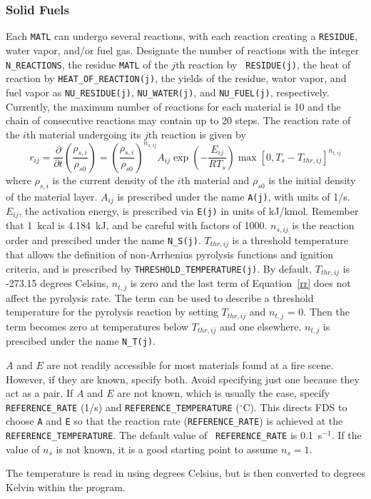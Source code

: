 \documentclass[11pt]{book}
\newcommand{\ct}{\tt\small}
\newcommand{\dod}[2]{\frac{\partial #1}{\partial #2}}
\newcommand{\be}{\begin{equation}}
\newcommand{\ee}{\end{equation}}
\begin{document}
\subsubsection{Solid Fuels}

Each {\ct MATL} can undergo several reactions, with each
reaction creating a {\ct RESIDUE}, water vapor, and/or fuel
gas. Designate the number of reactions with the integer {\ct
N\_REACTIONS}, the residue {\ct MATL} of the $j$th reaction by {\ct
RESIDUE(j)}, the heat of reaction by {\ct HEAT\_OF\_REACTION(j)}, the
yields of the residue, wator vapor, and fuel vapor as
{\ct NU\_RESIDUE(j)}, {\ct NU\_WATER(j)}, and {\ct NU\_FUEL(j)},
respectively. Currently, the maximum number of reactions for each
material is 10 and the chain of consecutive reactions may contain up
to 20 steps. The reaction rate of the $i$th material undergoing its
$j$th reaction is given by
\be
  r_{ij} =
  \dod{ }{t} \left( \frac{\rho_{s,i}}{\rho_{s0}} \right) =
  \left(\frac{\rho_{s,i}}{\rho_{s0}} \right)^{n_{s,ij}}
  A_{ij} \exp\left(-\frac{E_{ij}}{RT_s} \right)
  \max\left[0,T_s-T_{thr,ij}\right]^{n_{t,ij}}  \label{rr}
\ee
where $\rho_{s,i}$ is the current density of the $i$th material and
$\rho_{s0}$ is the initial density of the material layer.
$A_{ij}$ is prescribed under the name {\ct A(j)}, with units of
1/s. $E_{ij}$, the activation energy, is prescribed via {\ct E(j)} in
units of kJ/kmol. Remember that 1~kcal is 4.184~kJ, and be careful
with factors of 1000. $n_{s,ij}$ is the reaction order and prescibed under the name
{\ct N\_S(j)}. $T_{thr,ij}$ is a threshold temperature that
allows the definition of non-Arrhenius pyrolysis functions and
ignition criteria, and is prescribed by {\ct THRESHOLD\_TEMPERATURE(j)}.
By default, $T_{thr,ij}$ is -273.15 degrees Celsius, $n_{t,j}$ is zero
and the last term of Equation~\ref{rr} does not affect the pyrolysis rate.
The term can be used to describe a threshold temperature for the pyrolysis
reaction by setting $T_{thr,ij}$ and $n_{t,j}$ = 0. Then the term
becomes zero at temperatures below $T_{thr,ij}$ and one elsewhere.
$n_{t,j}$ is prescibed under the name {\ct N\_T(j)}.

$A$ and $E$  are not readily accessible for most materials found at a
fire scene. However, if they are known, specify both. Avoid specifying
just one because they act as a pair.  If $A$ and $E$ are not known,
which is usually the case, specify {\ct REFERENCE\_RATE} (1/s) and
{\ct REFERENCE\_TEMPERATURE} ($^\circ$C). This directs FDS to choose
{\ct A} and {\ct E} so that the reaction rate ({\ct REFERENCE\_RATE})
is achieved at the {\ct REFERENCE\_TEMPERATURE}. The default value of {\ct
REFERENCE\_RATE} is 0.1~s$^{-1}$. If the value of $n_s$ is not known,
it is a good starting point to assume $n_s=1$.
\begin{warning}
\noindent
The temperature is read in using degrees Celsius, but is then converted to
degrees Kelvin within the program.
\end{warning}
\end{document}
